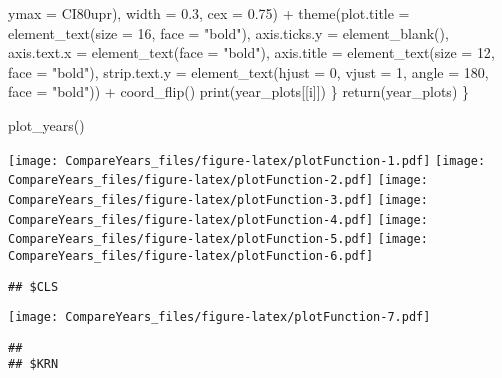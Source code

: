 \documentclass[
]{article}
\newenvironment{Shaded}{\begin{snugshade}}{\end{snugshade}}
\newcommand{\AttributeTok}[1]{\textcolor[rgb]{0.77,0.63,0.00}{#1}}
\newcommand{\DecValTok}[1]{\textcolor[rgb]{0.00,0.00,0.81}{#1}}
\newcommand{\FloatTok}[1]{\textcolor[rgb]{0.00,0.00,0.81}{#1}}
\newcommand{\FunctionTok}[1]{\textcolor[rgb]{0.00,0.00,0.00}{#1}}
\newcommand{\NormalTok}[1]{#1}
\newcommand{\SpecialCharTok}[1]{\textcolor[rgb]{0.00,0.00,0.00}{#1}}
\newcommand{\StringTok}[1]{\textcolor[rgb]{0.31,0.60,0.02}{#1}}
\begin{document}
\begin{Shaded}
\begin{Highlighting}[]
                                   \AttributeTok{ymax =}\NormalTok{ CI80upr),}
                               \AttributeTok{width =} \FloatTok{0.3}\NormalTok{,}
                               \AttributeTok{cex =} \FloatTok{0.75}\NormalTok{) }\SpecialCharTok{+}
                 \FunctionTok{theme}\NormalTok{(}\AttributeTok{plot.title =} \FunctionTok{element\_text}\NormalTok{(}\AttributeTok{size =} \DecValTok{16}\NormalTok{, }\AttributeTok{face =} \StringTok{"bold"}\NormalTok{),}
                       \AttributeTok{axis.ticks.y =} \FunctionTok{element\_blank}\NormalTok{(),}
                       \AttributeTok{axis.text.x =} \FunctionTok{element\_text}\NormalTok{(}\AttributeTok{face =} \StringTok{"bold"}\NormalTok{),}
                       \AttributeTok{axis.title =} \FunctionTok{element\_text}\NormalTok{(}\AttributeTok{size =} \DecValTok{12}\NormalTok{,}
                                                 \AttributeTok{face =} \StringTok{"bold"}\NormalTok{),}
                       \AttributeTok{strip.text.y =} \FunctionTok{element\_text}\NormalTok{(}\AttributeTok{hjust =} \DecValTok{0}\NormalTok{,}
                                                   \AttributeTok{vjust =} \DecValTok{1}\NormalTok{,}
                                                   \AttributeTok{angle =} \DecValTok{180}\NormalTok{,}
                                                   \AttributeTok{face =} \StringTok{"bold"}\NormalTok{)) }\SpecialCharTok{+}
                 \FunctionTok{coord\_flip}\NormalTok{()}
    \FunctionTok{print}\NormalTok{(year\_plots[[i]])}
\NormalTok{  \}}
  \FunctionTok{return}\NormalTok{(year\_plots)}
\NormalTok{\}}

\FunctionTok{plot\_years}\NormalTok{()}
\end{Highlighting}
\end{Shaded}

\texttt{[image: CompareYears\_files/figure-latex/plotFunction-1.pdf]}
\texttt{[image: CompareYears\_files/figure-latex/plotFunction-2.pdf]}
\texttt{[image: CompareYears\_files/figure-latex/plotFunction-3.pdf]}
\texttt{[image: CompareYears\_files/figure-latex/plotFunction-4.pdf]}
\texttt{[image: CompareYears\_files/figure-latex/plotFunction-5.pdf]}
\texttt{[image: CompareYears\_files/figure-latex/plotFunction-6.pdf]}

\begin{verbatim}
## $CLS
\end{verbatim}

\texttt{[image: CompareYears\_files/figure-latex/plotFunction-7.pdf]}

\begin{verbatim}
## 
## $KRN
\end{verbatim}
\end{document}
